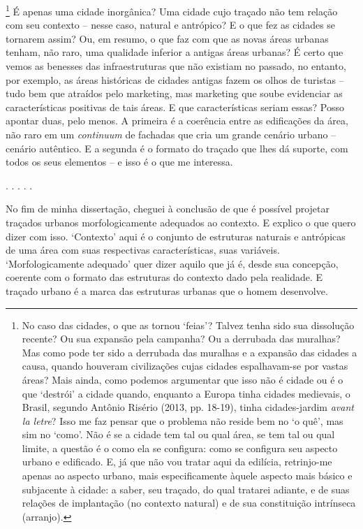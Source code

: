 \documentclass[]{report}
\begin{document}
		\footnote[3]{No caso das cidades, o que as tornou `feias'? Talvez tenha sido sua dissolução recente? Ou sua expansão pela campanha? Ou a derrubada das muralhas? Mas como pode ter sido a derrubada das muralhas e a expansão das cidades a causa, quando houveram civilizações cujas cidades espalhavam-se por vastas áreas? Mais ainda, como podemos argumentar que isso não é cidade ou é o que `destrói' a cidade quando, enquanto a Europa tinha cidades medievais, o Brasil, segundo Antônio Risério (2013, pp. 18-19), tinha cidades-jardim \textit{avant la letre}? Isso me faz pensar que o problema não reside bem no `o quê', mas sim no `como'. Não é se a cidade tem tal ou qual área, se tem tal ou qual limite, a questão é o como ela se configura: como se configura seu aspecto urbano e edificado. E, já que não vou tratar aqui da edilícia, retrinjo-me apenas ao aspecto urbano, mais especificamente àquele aspecto mais básico e subjacente à cidade: a saber, seu traçado, do qual tratarei adiante, e de suas relações de implantação (no contexto natural) e de sua constituição intrínseca (arranjo).}
	É apenas uma cidade inorgânica? Uma cidade cujo traçado não tem relação com seu contexto – nesse caso, natural e antrópico? E o que fez as cidades se tornarem assim? Ou, em resumo, o que faz com que as novas áreas urbanas tenham, não raro, uma qualidade inferior a antigas áreas urbanas? É certo que vemos as benesses das infraestruturas que não existiam no passado, no entanto, por exemplo, as áreas históricas de cidades antigas fazem os olhos de turistas – tudo bem que atraídos pelo marketing, mas marketing que soube evidenciar as características positivas de tais áreas. E que características seriam essas? Posso apontar duas, pelo menos. A primeira é a coerência entre as edificações da área, não raro em um \textit{continuum} de fachadas que cria um grande cenário urbano – cenário autêntico. E a segunda é o formato do traçado que lhes dá suporte, com todos os seus elementos – e isso é o que me interessa.

	\begin{center}
		. . . . .
	\end{center}

	No fim de minha dissertação, cheguei à conclusão de que é possível projetar traçados urbanos morfologicamente adequados ao contexto. E explico o que quero dizer com isso. `Contexto' aqui é o conjunto de estruturas naturais e antrópicas de uma área com suas respectivas características, suas variáveis. `Morfologicamente adequado' quer dizer aquilo que já é, desde sua concepção, coerente com o formato das estruturas do contexto dado pela realidade. E traçado urbano é a marca das estruturas urbanas que o homem desenvolve.
	
\end{document}
